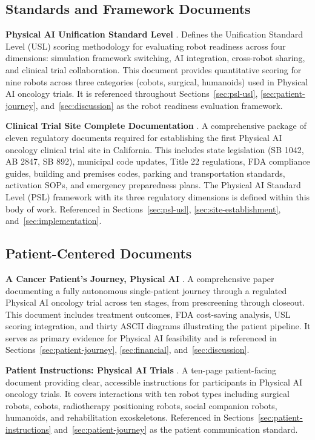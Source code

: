 \subsection*{Standards and Framework Documents}

\noindent\textbf{Physical AI Unification Standard Level} \cite{usl-standard}.
Defines the Unification Standard Level (USL) scoring methodology for evaluating
robot readiness across four dimensions: simulation framework switching, AI
integration, cross-robot sharing, and clinical trial collaboration. This
document provides quantitative scoring for nine robots across three categories
(cobots, surgical, humanoids) used in Physical AI oncology trials. It is
referenced throughout Sections~\ref{sec:psl-usl},
\ref{sec:patient-journey}, and~\ref{sec:discussion} as the robot readiness
evaluation framework.

\vspace{0.3cm}
\noindent\textbf{Clinical Trial Site Complete Documentation} \cite{site-docs}.
A comprehensive package of eleven regulatory documents required for establishing
the first Physical AI oncology clinical trial site in California. This includes
state legislation (SB 1042, AB 2847, SB 892), municipal code updates, Title 22
regulations, FDA compliance guides, building and premises codes, parking and
transportation standards, activation SOPs, and emergency preparedness plans. The
Physical AI Standard Level (PSL) framework with its three regulatory dimensions
is defined within this body of work. Referenced in Sections~\ref{sec:psl-usl},
\ref{sec:site-establishment}, and~\ref{sec:implementation}.

\subsection*{Patient-Centered Documents}

\noindent\textbf{A Cancer Patient's Journey, Physical AI}
\cite{patient-journey-paper}.
A comprehensive paper documenting a fully autonomous single-patient journey
through a regulated Physical AI oncology trial across ten stages, from
prescreening through closeout. This document includes treatment outcomes, FDA
cost-saving analysis, USL scoring integration, and thirty ASCII diagrams
illustrating the patient pipeline. It serves as primary evidence for Physical AI
feasibility and is referenced in Sections~\ref{sec:patient-journey},
\ref{sec:financial}, and~\ref{sec:discussion}.

\vspace{0.3cm}
\noindent\textbf{Patient Instructions: Physical AI Trials}
\cite{patient-instructions-paper}.
A ten-page patient-facing document providing clear, accessible instructions for
participants in Physical AI oncology trials. It covers interactions with ten
robot types including surgical robots, cobots, radiotherapy positioning robots,
social companion robots, humanoids, and rehabilitation exoskeletons. Referenced
in Sections~\ref{sec:patient-instructions} and~\ref{sec:patient-journey} as the
patient communication standard.

